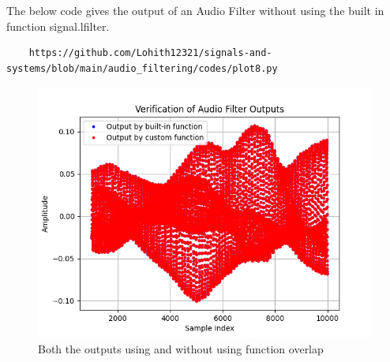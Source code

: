 \documentclass[journal,12pt,twocolumn]{IEEEtran}
\theoremstyle{remark}
\begin{document}
\begin{enumerate}[label=\thesection.\arabic*
,ref=\thesection.\theenumi]
\begin{enumerate}[label=\thesection.\arabic*
,ref=\thesection.\theenumi]
\solution The below code gives the output of an Audio Filter without using the built in function signal.lfilter.
\begin{lstlisting}
    https://github.com/Lohith12321/signals-and-systems/blob/main/audio_filtering/codes/plot8.py 
\end{lstlisting}

\begin{figure}[ht]
\centering
\includegraphics[width=\columnwidth]{figs/plot8.png}
\caption{Both the outputs using and without using function overlap}
\label{fig:plot8}
\end{figure}


\end{enumerate}
\end{enumerate}
\end{document}
